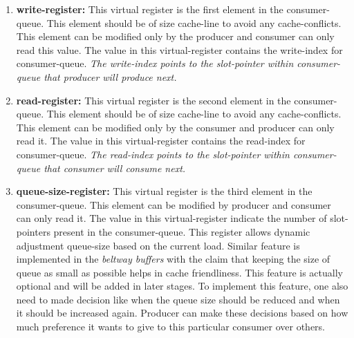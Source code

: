 \documentclass[a4paper,twoside]{report} %
\begin{document}
\begin{enumerate} 
  \item \textbf{write-register:} This virtual register is the first
  element in the consumer-queue.  This element should be of size
  cache-line to avoid any cache-conflicts.  This element can be
  modified only by the producer and consumer can only read this value.
  The value in this virtual-register contains the write-index for
  consumer-queue.  \textit{The write-index points to the slot-pointer within
  consumer-queue that producer will produce next.}

  \item \textbf{read-register:} This virtual register is the second
  element in the consumer-queue.  This element should be of size
  cache-line to avoid any cache-conflicts.  This element can be
  modified only by the consumer and producer can only read it.
  The value in this virtual-register contains the read-index for
  consumer-queue.  \textit{The read-index points to the slot-pointer within
  consumer-queue that consumer will consume next.}

  \item \textbf{queue-size-register:} This virtual register is the third
  element in the consumer-queue.  This element can be modified by
  producer and consumer can only read it.  The value in this
  virtual-register indicate the number of slot-pointers present in the
  consumer-queue.  This register allows dynamic adjustment queue-size
  based on the current load.  Similar feature is implemented in the
  \textit{beltway buffers} with the claim that keeping the size of 
  queue as small as possible helps in cache friendliness.  This
  feature is actually optional and will be added in later stages.
  To implement this feature, one also need to made decision like when
  the queue size should be reduced and when it should be increased
  again.  Producer can make these decisions based on how much
  preference it wants to give to this particular consumer over others.


\end{enumerate}
\end{document}
